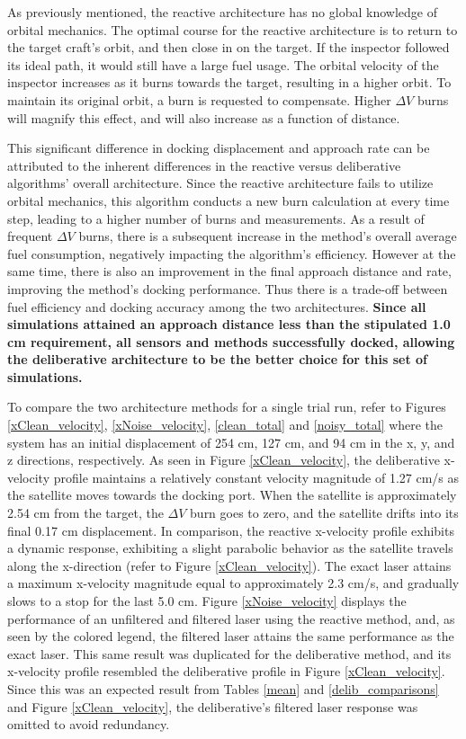 \documentclass[journal, 10pt]{IEEEtran}
\begin{document}
As previously mentioned, the reactive architecture has no global knowledge of orbital mechanics. The optimal course for the reactive architecture is to return to the target craft's orbit, and then close in on the target. If the inspector followed its ideal path, it would still have a large fuel usage.  The orbital velocity of the inspector increases as it burns towards the target, resulting in a higher orbit.  To maintain its original orbit, a burn is requested to compensate.  Higher $\Delta V$ burns will magnify this effect, and will also increase as a function of distance.

This significant difference in docking displacement and approach rate can be attributed to the inherent differences in the reactive versus deliberative algorithms' overall architecture. Since the reactive architecture fails to utilize orbital mechanics, this algorithm conducts a new burn calculation at every time step, leading to a higher number of burns and measurements. As a result of frequent $\Delta V$ burns, there is a subsequent increase in the method's overall average fuel consumption, negatively impacting the algorithm's efficiency. However at the same time, there is also an improvement in the final approach distance and rate, improving the method's docking performance. Thus there is a trade-off between fuel efficiency and docking accuracy among the two architectures.\textbf{ Since all simulations attained an approach distance less than the stipulated 1.0 cm requirement, all sensors and methods successfully docked, allowing the deliberative architecture to be the better choice for this set of simulations.}

To compare the two architecture methods for a single trial run, refer to Figures \ref{xClean_velocity}, \ref{xNoise_velocity}, \ref{clean_total} and \ref{noisy_total} where the system has an initial displacement of 254 cm, 127 cm, and 94 cm in the x, y, and z directions, respectively. As seen in Figure \ref{xClean_velocity}, the deliberative x-velocity profile maintains a relatively constant velocity magnitude of 1.27 cm/s as the satellite moves towards the docking port. When the satellite is approximately 2.54 cm from the target, the $\Delta V$ burn goes to zero, and the satellite drifts into its final 0.17 cm displacement. In comparison, the reactive x-velocity profile exhibits a dynamic response, exhibiting a slight parabolic behavior as the satellite travels along the x-direction (refer to Figure \ref{xClean_velocity}). The exact laser attains a maximum x-velocity magnitude equal to approximately 2.3 cm/s, and gradually slows to a stop for the last 5.0 cm. Figure \ref{xNoise_velocity} displays the performance of an unfiltered and filtered laser using the reactive method, and, as seen by the colored legend, the filtered laser attains the same performance as the exact laser. This same result was duplicated for the deliberative method, and its x-velocity profile resembled the deliberative profile in Figure \ref{xClean_velocity}. Since this was an expected result from Tables \ref{mean} and \ref{delib_comparisons} and Figure \ref{xClean_velocity}, the deliberative's filtered laser response was omitted to avoid redundancy. 
\end{document}
